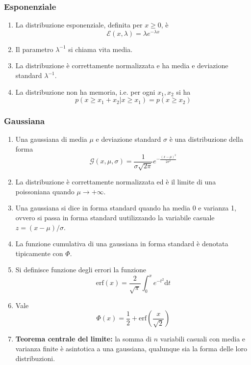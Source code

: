 \documentclass[a4paper,11pt]{article}
\begin{document}
\subsubsection{Esponenziale}
\begin{enumerate}[resume]
	\item La distribuzione esponenziale, definita per $x\geq0$, è
	\[\mathcal{E}(x,\lambda)=\lambda e^{-\lambda x}\]
	\item Il parametro $\lambda^{-1}$ si chiama vita media.
	\item La distribuzione è correttamente normalizzata e ha media e deviazione standard $\lambda^{-1}$.
	\item La distribuzione non ha memoria, i.e. per ogni $x_1,x_2$ si ha 
	\[p(x\geq x_1+x_2|x\geq x_1)=p(x\geq x_2)\]
	
\end{enumerate}
\subsubsection{Gaussiana}
\begin{enumerate}[resume]
	\item Una gaussiana di media $\mu$ e deviazione standard $\sigma$ è una distribuzione della forma
	\[\mathcal{G}(x,\mu,\sigma)=\frac{1}{\sigma\sqrt{2\pi}}e^{-\frac{(x-\mu)^2}{2\sigma^2}}\]
	\item La distribuzione è correttamente normalizzata ed è il limite di una poissoniana quando $\mu\to+\infty$.
	\item Una gaussiana si dice in forma standard quando ha media 0 e varianza 1, ovvero si passa in forma standard uutilizzando la variabile casuale $z=(x-\mu)/\sigma$.
	\item La funzione cumulativa di una gaussiana in forma standard è denotata tipicamente con $\Phi$.
	\item Si definisce funzione degli errori la funzione
	\[\textrm{erf}(x)=\frac{2}{\sqrt{\pi}}\int_{0}^{x}e^{-t^2}\mathrm{d}t\]
	\item Vale
	\[\Phi(x)=\frac{1}{2}+\textrm{erf}\left(\frac{x}{\sqrt{2}}\right)\]
	\item\textbf{Teorema centrale del limite:} la somma di $n$ variabili casuali con media e varianza finite è asintotica a una gaussiana, qualunque sia la forma delle loro distribuzioni.
\end{enumerate}
\end{document}
